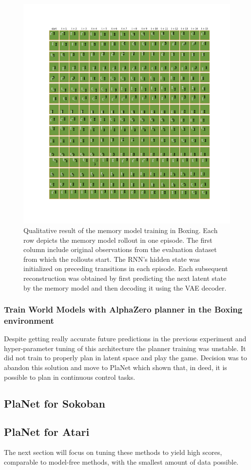 \begin{figure}[H]
\includegraphics[width=1\textwidth,keepaspectratio]{figures/Boxing_memory.png}
\caption[Qualitative result of the memory model training in Sokoban]{Qualitative result of the memory model training in Boxing. Each row depicts the memory model rollout in one episode. The first column include original observations from the evaluation dataset from which the rollouts start. The RNN's hidden state was initialized on preceding transitions in each episode. Each subsequent reconstruction was obtained by first predicting the next latent state by the memory model and then decoding it using the VAE decoder.}
\label{Fig.Sokoban_memory}
\end{figure}

\subsubsection{Train World Models with AlphaZero planner in the Boxing environment}

Despite getting really accurate future predictions in the previous experiment and hyper-parameter tuning of this architecture the planner training was unstable. It did not train to properly plan in latent space and play the game. Decision was to abandon this solution and move to PlaNet which shown that, in deed, it is possible to plan in continuous control tasks. 

\subsection{PlaNet for Sokoban}

\subsection{PlaNet for Atari}

The next section will focus on tuning these methods to yield high scores, comparable to model-free methods, with the smallest amount of data possible.
